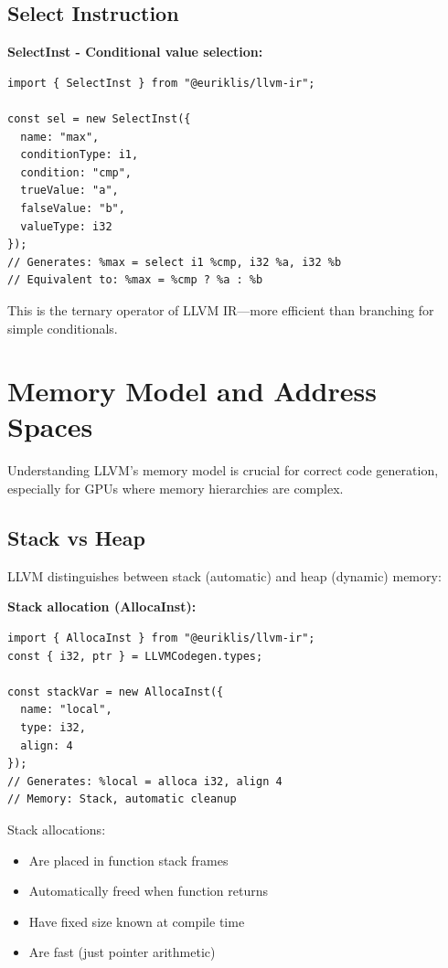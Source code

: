 \documentclass[11pt]{article}
\begin{document}
\subsection{Select Instruction}

\textbf{SelectInst - Conditional value selection:}
\begin{lstlisting}[style=ts]
import { SelectInst } from "@euriklis/llvm-ir";

const sel = new SelectInst({
  name: "max",
  conditionType: i1,
  condition: "cmp",
  trueValue: "a",
  falseValue: "b",
  valueType: i32
});
// Generates: %max = select i1 %cmp, i32 %a, i32 %b
// Equivalent to: %max = %cmp ? %a : %b
\end{lstlisting}

This is the ternary operator of LLVM IR—more efficient than branching for simple conditionals.

\section{Memory Model and Address Spaces}

Understanding LLVM's memory model is crucial for correct code generation, especially for GPUs where memory hierarchies are complex.

\subsection{Stack vs Heap}

LLVM distinguishes between stack (automatic) and heap (dynamic) memory:

\textbf{Stack allocation (AllocaInst):}
\begin{lstlisting}[style=ts]
import { AllocaInst } from "@euriklis/llvm-ir";
const { i32, ptr } = LLVMCodegen.types;

const stackVar = new AllocaInst({
  name: "local",
  type: i32,
  align: 4
});
// Generates: %local = alloca i32, align 4
// Memory: Stack, automatic cleanup
\end{lstlisting}

Stack allocations:
\begin{itemize}[noitemsep]
  \item Are placed in function stack frames
  \item Automatically freed when function returns
  \item Have fixed size known at compile time
  \item Are fast (just pointer arithmetic)
\end{itemize}
\end{document}
